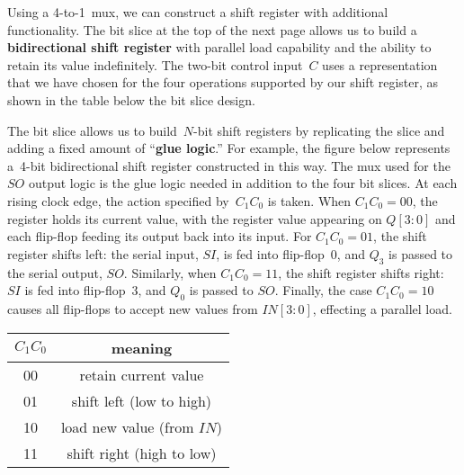 \centerline{}

Using a \mbox{4-to-1}~mux, we can construct a shift
register with additional functionality.  The bit slice at the top
of the next page allows us to build a {\bf bidirectional shift register} with 
parallel load capability and the ability to retain its value indefinitely.
The two-bit control input~$C$ uses a representation that
we have chosen for the four operations supported by our shift register, 
as shown in the table below the bit slice design.

\begin{minipage}{3.95in}
The bit slice allows us to build~\mbox{$N$-bit} shift registers by
replicating the slice and adding a fixed amount of ``{\bf glue logic}.''
For example, the figure below represents a~\mbox{4-bit} bidirectional 
shift register constructed in this way.  The mux
used for the $SO$ output logic is the glue logic needed in addition
to the four bit slices.
%
At each rising clock edge, the action specified by~$C_1C_0$ is taken.  
When $C_1C_0=00$, the
register holds its current value, with the register
value appearing on
$Q[3:0]$ and each flip-flop feeding its output back into its input.
For $C_1C_0=01$, the shift register shifts left: the serial input,
$SI$, is fed into flip-flop~0, and $Q_3$ is passed to the serial
output, $SO$.  Similarly, when $C_1C_0=11$, the shift register shifts
right: $SI$ is fed into flip-flop~3, and $Q_0$ is passed to $SO$.
Finally, the case $C_1C_0=10$ causes all flip-flops to accept new
values from $IN[3:0]$, effecting a parallel load.\\
\end{minipage}\hspace{.25in}%
\begin{minipage}{2.3in}
\vspace{6pt}
\begin{tabular}{c|c}
$C_1C_0$& meaning\\ \hline
00& retain current value\\
01& shift left (low to high)\\
10& load new value (from $IN$)\\
11& shift right (high to low)\\
\end{tabular}
\end{minipage}\vspace{-4pt}

\centerline{}

